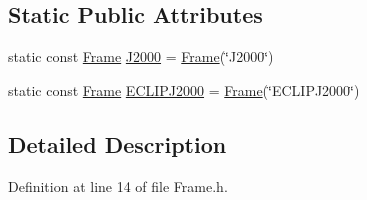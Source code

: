 \subsection*{Static Public Attributes}
\begin{DoxyCompactItemize}
\item 
static const \hyperlink{class_frame}{Frame} \hyperlink{class_frame_a83f98b1d0aa72dca955fd91752e6b499}{J2000} = \hyperlink{class_frame}{Frame}(\char`\"{}J2000\char`\"{})
\item 
static const \hyperlink{class_frame}{Frame} \hyperlink{class_frame_af25db3f51bb9838c9bce46d30e663331}{E\+C\+L\+I\+P\+J2000} = \hyperlink{class_frame}{Frame}(\char`\"{}E\+C\+L\+I\+P\+J2000\char`\"{})
\end{DoxyCompactItemize}


\subsection{Detailed Description}


Definition at line 14 of file Frame.\+h.



